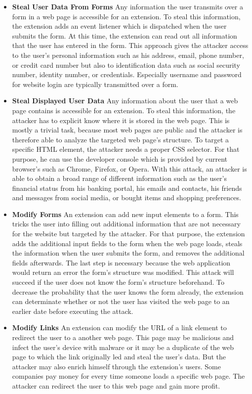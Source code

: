 	\begin{itemize}
		\item \textbf{Steal User Data From Forms} Any information the user transmits over a form in a web page is accessible for an extension. To steal this information, the extension adds an event listener which is dispatched when the user submits the form. At this time, the extension can read out all information that the user has entered in the form. This approach gives the attacker access to the user's personal information such as his address, email, phone number, or credit card number but also to identification data such as social security number, identity number, or credentials. Especially username and password for website login are typically transmitted over a form.
		
		\item \textbf{Steal Displayed User Data} Any information about the user that a web page contains is accessible for an extension. To steal this information, the attacker has to explicit know where it is stored in the web page. This is mostly a trivial task, because most web pages are public and the attacker is therefore able to analyze the targeted web page's structure. To target a specific HTML element, the attacker needs a proper CSS selector. For that purpose, he can use the developer console which is provided by current browser's such as Chrome, Firefox, or Opera. With this attack, an attacker is able to obtain a broad range of different information such as the user's financial status from his banking portal, his emails and contacts, his friends and messages from social media, or bought items and shopping preferences.
		
		\item \textbf{Modify Forms} An extension can add new input elements to a form. This tricks the user into filling out additional information that are not necessary for the website but targeted by the attacker. For that purpose, the extension adds the additional input fields to the form when the web page loads, steals the information when the user submits the form, and removes the additional fields afterwards. The last step is necessary because the web application would return an error the form's structure was modified. This attack will succeed if the user does not know the form's structure beforehand. To decrease the probability that the user knows the form already, the extension can determinate whether or not the user has visited the web page to an earlier date before executing the attack. 
		
		\item \textbf{Modify Links} An extension can modify the URL of a link element to redirect the user to a another web page. This page may be malicious and infect the user's device with malware or it may be a duplicate of the web page to which the link originally led and steal the user's data. But the attacker may also enrich himself through the extension's users. Some companies pay money for every time someone loads a specific web page. The attacker can redirect the user to this web page and gain more profit. 
	\end{itemize}
	
